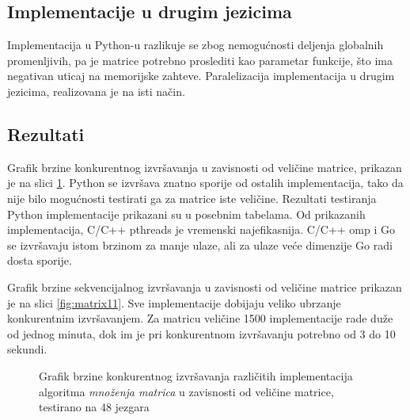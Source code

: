 \documentclass[12pt,oneside]{memoir}
\begin{document}
\subsection{Implementacije u drugim jezicima}
Implementacija u Python-u razlikuje se zbog nemogućnosti deljenja globalnih promenljivih, pa je matrice potrebno proslediti kao parametar funkcije, što ima negativan uticaj na memorijske zahteve. Paralelizacija implementacija u drugim jezicima, realizovana je na isti način. 

\subsection{Rezultati}

Grafik brzine konkurentnog izvršavanja u zavisnosti od veličine matrice, prikazan je na slici \ref{fig:matrix1}. Python se izvršava znatno sporije od ostalih implementacija, tako da nije bilo mogućnosti testirati ga za matrice iste veličine. Rezultati testiranja Python implementacije prikazani su u posebnim tabelama. Od prikazanih implementacija, C/C++ pthreads je vremenski najefikasnija. C/C++ omp i Go se izvršavaju istom brzinom za manje ulaze, ali za ulaze veće dimenzije Go radi dosta sporije. 

Grafik brzine sekvencijalnog izvršavanja u zavisnosti od veličine matrice prikazan je na slici \ref{fig:matrix11}. Sve implementacije dobijaju veliko ubrzanje konkurentnim izvršavanjem. Za matricu veličine 1500 implementacije rade duže od jednog minuta, dok im je pri konkurentnom izvršavanju potrebno od 3 do 10 sekundi.

\begin{figure}
\begin{center}


\caption{Grafik brzine konkurentnog izvršavanja različitih implementacija algoritma \textit{množenja matrica} u zavisnosti od veličine matrice, testirano na 48 jezgara}
\label{fig:matrix1}
\end{center}
\end{figure}
\end{document}
